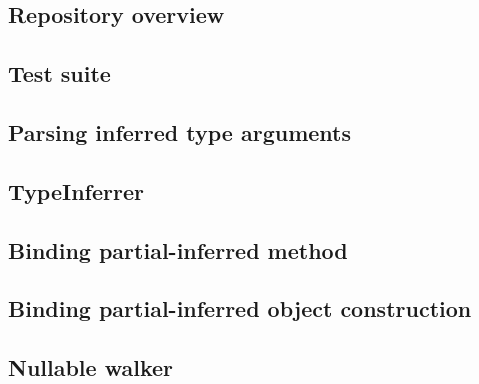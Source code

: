 \subsection{Repository overview}


\subsection{Test suite}


\subsection{Parsing inferred type arguments}


\subsection{TypeInferrer}


\subsection{Binding partial-inferred method}


\subsection{Binding partial-inferred object construction}


\subsection{Nullable walker}


